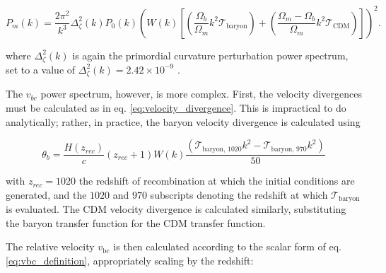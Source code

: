 \documentclass[floats,floatfix,showpacs,amssymb,prd,superscriptaddress,nofootinbib]{revtex4-2} %
\newcommand{\red}{\textcolor{red}}
\begin{document}
\begin{equation}
    P_m(k) = \frac{2\pi^2}{k^3} \Delta_\zeta ^2 (k) P_0 (k) \left( W(k) \left[ \left( \frac{\Omega_b}{\Omega_m} k^2 \mathcal{T}_{\text{baryon}} \right) + \left( \frac{\Omega_m - \Omega_b}{\Omega_m} k^2 \mathcal{T}_{\text{CDM}} \right) \right] \right)^2.
\end{equation}

\noindent where $\Delta_\zeta ^2 (k)$ is again the primordial curvature perturbation power spectrum, set to a value of $\Delta_\zeta ^2 (k) = 2.42 \times 10^{-9}$ \citep{Dunkley_2009}.



The $v_{bc}$ power spectrum, however, is more complex. First, the velocity divergences must be calculated as in eq. \ref{eq:velocity_divergence}. This is impractical to do analytically; rather, in practice, the baryon velocity divergence is calculated using

\begin{equation}
    \theta_b = \frac{H(z_{rec})}{c} (z_{rec} + 1) W(k) \frac{\left( \mathcal{T}_{\text{baryon, 1020}} k^2 - \mathcal{T}_{\text{baryon, 970}} k^2 \right)}{50} 
    \label{eq:velocity_divergence_practical_calculation}
\end{equation}

\noindent with $z_{rec} = 1020$ the redshift of recombination at which the initial conditions are generated, and the $1020$ and $970$ subscripts denoting the redshift at which $\mathcal{T}_{\text{baryon}}$ is evaluated. The CDM velocity divergence is calculated similarly, substituting the baryon transfer function for the CDM transfer function.

The relative velocity 
$v_\text{bc}$ is then calculated according to the scalar form of eq. \ref{eq:vbc_definition}, appropriately scaling by the redshift:
\end{document}

